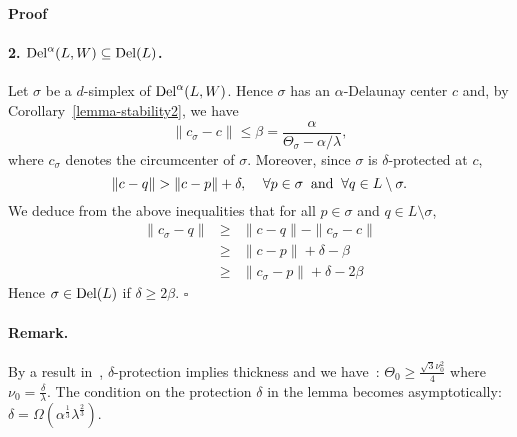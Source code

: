 \documentclass[11pt,a4paper]{article}
\newenvironment{proof}
        {\noindent \textbf{Proof} \hspace{0.3mm}}
        {\hspace{0.3mm}$\square$  \smallskip}
\newcommand{\e}{\varepsilon}
\newcommand{\del}{{\rm Del}}
\newcommand{\wit}{{\rm Wit}}
\begin{document}
\begin{proof}
\paragraph{2. $\del^{\alpha}(L,W)\subseteq \del (L)$.}
Let $\sigma$ be a $d$-simplex of $\del^{\alpha} (L,W)$. Hence $\sigma$ has an
$\alpha$-Delaunay center $c$ and, by Corollary~\ref{lemma-stability2}, we have
\[ \| c_{\sigma}-c\| \leq \beta=
\frac{\alpha}{\Theta_{\sigma}-\alpha/\lambda}, \] 
 where
$c_{\sigma}$ denotes the circumcenter of $\sigma$. Moreover, since
$\sigma$ is $\delta$-protected at $c$,
\[ \| c-q\| > \| c-p\| + \delta,\;\;  \;\; \forall p\in \sigma \;\; {\rm
  and}\;\; \forall q\in L\setminus \sigma.\]
We deduce from the above inequalities that for all $p\in \sigma$ and $q\in L\setminus \sigma$,
\begin{eqnarray*}
\| c_{\sigma}-q\| & \geq &  \| c-q\|  - \| c_{\sigma}-c\| \\
& \geq & \| c-p\| + \delta - \beta \\
& \geq & \| c_{\sigma}-p\| + \delta -2\beta
\end{eqnarray*}
Hence $\sigma\in \del(L)$ if $\delta\geq 2\beta$.
%
%
\end{proof}

\paragraph{Remark.} By a result in~\cite{boissonnat:hal-00807050},
$\delta$-protection implies thickness and we have~:
$\Theta_0\geq \frac{\sqrt{3}\nu_0^2}{4} $ where
$\nu_0= \frac{\delta}{\lambda}$. The condition on the protection
$\delta$ in the lemma becomes asymptotically: $\delta = \Omega (\alpha^{\frac{1}{3}}\lambda^{\frac{2}{3}})$.
\end{document}
